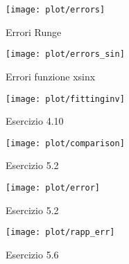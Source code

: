 \begin{figure}[h]
\caption{Errori Runge}
\label{erunge_nak}
\texttt{[image: plot/errors]}
\end{figure}
\begin{figure}[h]
\caption{Errori funzione xsinx}
\label{esin_nak}
\texttt{[image: plot/errors\_sin]}
\end{figure}
\begin{figure}[h]
\caption{Esercizio 4.10}
\label{fitting}
\texttt{[image: plot/fittinginv]}
\end{figure}
\begin{figure}[h]
\caption{Esercizio 5.2}
\label{PR_comparison}
\texttt{[image: plot/comparison]}
\end{figure}
\begin{figure}[h]
\caption{Esercizio 5.2}
\label{QuadrErr}
\texttt{[image: plot/error]}
\end{figure}
\begin{figure}[h]
\caption{Esercizio 5.6}
\label{QuadrRapp}
\texttt{[image: plot/rapp\_err]}
\end{figure}